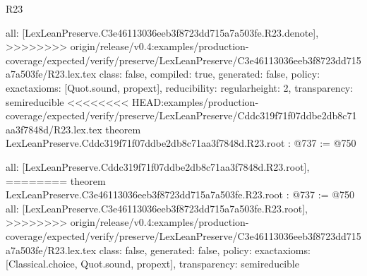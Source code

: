 \begin{lexlean}{R23}
\begin{coremodule}
{{{{{  all: [LexLeanPreserve.C3e46113036eeb3f8723dd715a7a503fe.R23.denote],
>>>>>>>> origin/release/v0.4:examples/production-coverage/expected/verify/preserve/LexLeanPreserve/C3e46113036eeb3f8723dd715a7a503fe/R23.lex.tex
  class: false,
  compiled: true,
  generated: false,
  policy: exact{axioms: [Quot.sound, propext]},
  reducibility: regular{height: 2},
  transparency: semireducible
}
<<<<<<<< HEAD:examples/production-coverage/expected/verify/preserve/LexLeanPreserve/Cddc319f71f07ddbe2db8c71aa3f7848d/R23.lex.tex
theorem LexLeanPreserve.Cddc319f71f07ddbe2db8c71aa3f7848d.R23.root : @737 := @750 {
  all: [LexLeanPreserve.Cddc319f71f07ddbe2db8c71aa3f7848d.R23.root],
========
theorem LexLeanPreserve.C3e46113036eeb3f8723dd715a7a503fe.R23.root : @737 := @750 {
  all: [LexLeanPreserve.C3e46113036eeb3f8723dd715a7a503fe.R23.root],
>>>>>>>> origin/release/v0.4:examples/production-coverage/expected/verify/preserve/LexLeanPreserve/C3e46113036eeb3f8723dd715a7a503fe/R23.lex.tex
  class: false,
  generated: false,
  policy: exact{axioms: [Classical.choice, Quot.sound, propext]},
  transparency: semireducible
}

}}}}}
\end{coremodule}
\end{lexlean}
